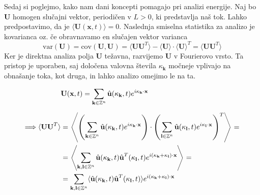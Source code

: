 \documentclass[mat2, tisk]{fmfdelo}
\newcommand{\Z}{\mathbb Z}
\newcommand{\bd}{\textbf}
\begin{document}
Sedaj si poglejmo, kako nam dani koncepti pomagajo pri analizi 
energije. Naj bo $\bd{U}$  homogen slučajni vektor, periodičen v $L>0$, ki predstavlja naš tok. 
Lahko predpostavimo, da je $\langle \bd{U}(\bd{x}, t) \rangle = 0$. Naslednja 
smiselna statistika za analizo je kovarianca oz. če obravnavamo en 
slučajen vektor varianca 
$$
\text{var}(\bd{U}) = \text{cov}(\bd{U}, \bd{U}) = \langle \bd{U} \bd{U}^T \rangle - \langle \bd{U} \rangle \cdot \langle \bd{U} \rangle^T = \langle \bd{U} \bd{U}^T \rangle
$$
Ker je direktna analiza polja \bd{U} težavna, razvijemo \bd{U}
v Fourierovo vrsto. Ta pristop je uporaben, saj določena valovna 
števila $\bd{$\kappa$}_\bd{k}$ močneje vplivajo na obnašanje toka, kot 
druga, in lahko analizo omejimo le na ta. 

\begin{align*}
&\bd{U}(\bd{x}, t) = \sum_{\bd{k}\in \Z^{n}} \hat{\bd{u}}(\bd{\text{$\kappa$}}_\bd{k}, t) e^{i\bd{\text{$\kappa$}}_\bd{k} \cdot \bd{x}}\\[2mm]
\Longrightarrow \langle \bd{U} \bd{U}^T\rangle &= \left\langle \left(\sum_{\bd{k}\in \Z^{n}} \hat{\bd{u}}(\bd{\text{$\kappa$}}_\bd{k}, t) e^{i\bd{\text{$\kappa$}}_\bd{k} \cdot \bd{x}}\right) \cdot \left(\sum_{\bd{l}\in \Z^{n}} \hat{\bd{u}}(\bd{\text{$\kappa$}}_\bd{l}, t) e^{i\bd{\text{$\kappa$}}_\bd{l} \cdot \bd{x}}\right)^T \right\rangle = \\
&= \left\langle \sum_{\bd{k}, \bd{l}\in \Z^{n}} \hat{\bd{u}}(\bd{\text{$\kappa$}}_\bd{k}, t) \hat{\bd{u}}^T(\bd{\text{$\kappa$}}_\bd{l}, t) e^{i(\bd{\text{$\kappa$}}_\bd{k} + \bd{\text{$\kappa$}}_\bd{l})\cdot \bd{x}} \right\rangle = \\
&=  \sum_{\bd{k}, \bd{l}\in \Z^{n}} \langle \hat{\bd{u}}(\bd{\text{$\kappa$}}_\bd{k}, t) \hat{\bd{u}}^T(\bd{\text{$\kappa$}}_\bd{l}, t) \rangle e^{i(\bd{\text{$\kappa$}}_\bd{k} + \bd{\text{$\kappa$}}_\bd{l})\cdot \bd{x}} 
\end{align*}
\end{document}

